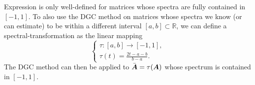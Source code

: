 Expression  is only well-defined for matrices whose spectra are fully
contained in $[-1, 1]$. To also use the \gls{DGC} method on matrices whose
spectra we know (or can estimate) to be within a different interval $[a, b] \subset \mathbb{R}$,
we can define a \gls{spectral-transformation} as the linear mapping
\begin{equation}
    \begin{cases}
        \tau : [a, b] \to [-1, 1], \\
        \tau(t) = \frac{2t - a - b}{b - a}.
    \end{cases}
    \label{equ:2-chebyshev-spectral-transformation}
\end{equation}
The \gls{DGC} method can then be applied to $\bar{\boldsymbol{A}} = \tau(\boldsymbol{A})$ whose
spectrum is contained in $[-1, 1]$.\\


